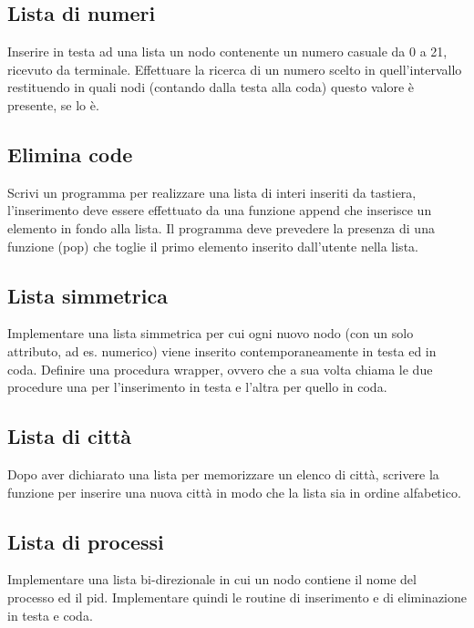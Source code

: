 \documentclass{article}
\begin{document}
\subsection{Lista di numeri} 
Inserire in testa ad una lista un nodo contenente un numero casuale da 0 a 21, ricevuto da terminale. Effettuare la ricerca di un numero scelto in quell'intervallo restituendo in quali nodi (contando dalla testa alla coda) questo valore è presente, se lo è.

\subsection{Elimina code} 
Scrivi un programma per realizzare una lista di interi inseriti da tastiera, l'inserimento deve essere effettuato da una funzione append che inserisce un elemento in fondo alla lista. Il programma deve prevedere la presenza di una funzione (pop) che toglie il primo elemento inserito dall'utente nella lista.

\subsection{Lista simmetrica}
Implementare una lista simmetrica per cui ogni nuovo nodo (con un solo attributo, ad es. numerico) viene inserito contemporaneamente in testa ed in coda. Definire una procedura wrapper, ovvero che a sua volta chiama le due procedure una per l'inserimento in testa e l'altra per quello in coda.

\subsection{Lista di città}
Dopo aver dichiarato una lista per memorizzare un elenco di città, scrivere la funzione per inserire una nuova città in modo che la lista sia in ordine alfabetico.

\subsection{Lista di processi}
Implementare una lista bi-direzionale in cui un nodo contiene il nome del processo ed il pid. Implementare quindi le routine di inserimento e di eliminazione in testa e coda.
\end{document}
